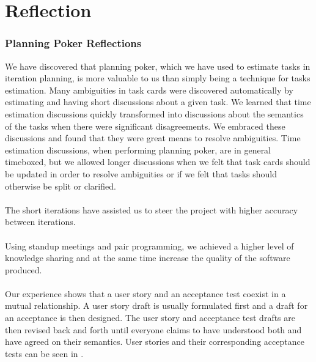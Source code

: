 
\chapter{Reflection}
\label{cha:reflection}

\subsection{Planning Poker Reflections}
We have discovered that planning poker, which we have used to estimate tasks in iteration planning, is more valuable to us than simply being a technique for tasks estimation. Many ambiguities in task cards were discovered automatically by estimating and having short discussions about a given task. We learned that time estimation discussions quickly transformed into discussions about the semantics of the tasks when there were significant disagreements. We embraced these discussions and found that they were great means to resolve ambiguities. Time estimation discussions, when performing planning poker, are in general timeboxed, but we allowed longer discussions when we felt that task cards should be updated in order to resolve ambiguities or if we felt that tasks should otherwise be split or clarified.
\\\\
The short iterations have assisted us to steer the project with higher accuracy between iterations. 
\\\\
Using standup meetings and pair programming, we achieved a higher level of knowledge sharing and at the same time increase the quality of the software produced. 
\\\\
Our experience shows that a user story and an acceptance test coexist in a mutual relationship. A user story draft is usually formulated first and a draft for an acceptance is then designed. The user story and acceptance test drafts are then revised back and forth until everyone claims to have understood both and have agreed on their semantics. User stories and their corresponding acceptance tests can be seen in .